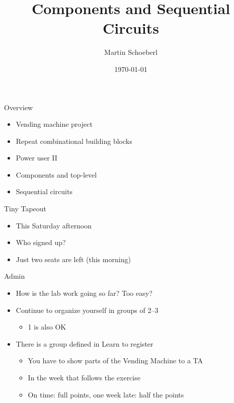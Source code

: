

\newif\ifbook



\title{Components and Sequential Circuits}
\author{Martin Schoeberl}
\date{\today}



\begin{frame}
\titlepage
\end{frame}

\begin{frame}[fragile]{Overview}
\begin{itemize}
\item Vending machine project
\item Repeat combinational building blocks
\item Power user II
\item Components and top-level
\item Sequential circuits
\end{itemize}
\end{frame}

\begin{frame}[fragile]{Tiny Tapeout}
\begin{itemize}
\item This Saturday afternoon
\item Who signed up?
\item Just two seats are left (this morning)
\end{itemize}
\end{frame}


\begin{frame}[fragile]{Admin}
\begin{itemize}
\item How is the lab work going so far? Too easy?
\item Continue to organize yourself in groups of 2--3
\begin{itemize}
\item 1 is also OK
\end{itemize}
\item There is a group defined in Learn to register
\begin{itemize}
\item You have to show parts of the Vending Machine to a TA
\item In the week that follows the exercise
\item On time: full points, one week late: half the points
\end{itemize}
\end{itemize}
\end{frame}


